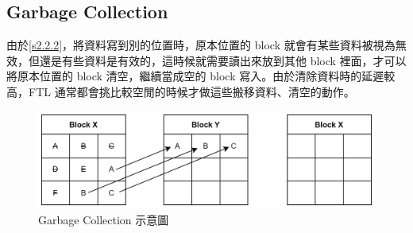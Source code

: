 \subsection{Garbage Collection}\label{s2.2.3}
\indent
由於\ref{s2.2.2}，將資料寫到別的位置時，原本位置的 block 就會有某些資料被視為無效，但還是有些資料是有效的，這時候就需要讀出來放到其他 block 裡面，才可以將原本位置的 block 清空，繼續當成空的 block 寫入。由於清除資料時的延遲較高，FTL 通常都會挑比較空閒的時候才做這些搬移資料、清空的動作。
\begin{figure}[H]
    \centering
    \includegraphics[width=1\textwidth]{picture/ch2/garbage_collection.png}
    \caption{Garbage Collection 示意圖\cite{Garbage_Collection}}
    \label{f2.7}
\end{figure}

